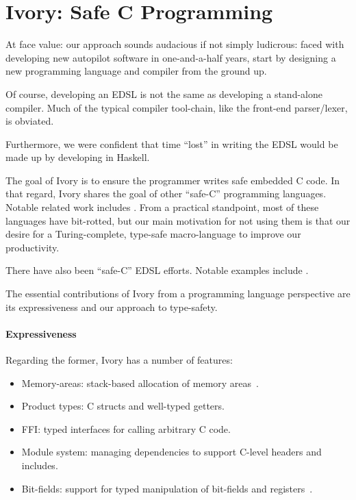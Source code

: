 \section{Ivory: Safe C Programming}

At face value: our approach sounds audacious if not simply ludicrous: faced with
developing new autopilot software in one-and-a-half years, start by designing a
new programming language and compiler from the ground up.

Of course, developing an EDSL is not the same as developing a stand-alone
compiler.  Much of the typical compiler tool-chain, like the front-end
parser/lexer, is obviated.

Furthermore, we were confident that time ``lost'' in writing the EDSL would be
made up by developing in Haskell.

The goal of Ivory is to ensure the programmer writes safe embedded C code.  In
that regard, Ivory shares the goal of other ``safe-C'' programming languages.
Notable related work includes .  From a
practical standpoint, most of these languages have bit-rotted, but our main
motivation for not using them is that our desire for a Turing-complete,
type-safe macro-language to improve our productivity.

There have also been ``safe-C'' EDSL efforts.  Notable examples include
.  

The essential contributions of Ivory from a programming language perspective are
its expressiveness and our approach to type-safety.

\paragraph{Expressiveness}
Regarding the former, Ivory has a number of features:

\begin{itemize}
  \item Memory-areas: stack-based allocation of memory areas~\cite{}.
  \item Product types: C structs and well-typed getters.
  \item FFI: typed interfaces for calling arbitrary C code.
  \item Module system: managing dependencies to support C-level headers and
    includes.
  \item Bit-fields: support for typed manipulation of bit-fields and registers~\cite{}.
\end{itemize}

